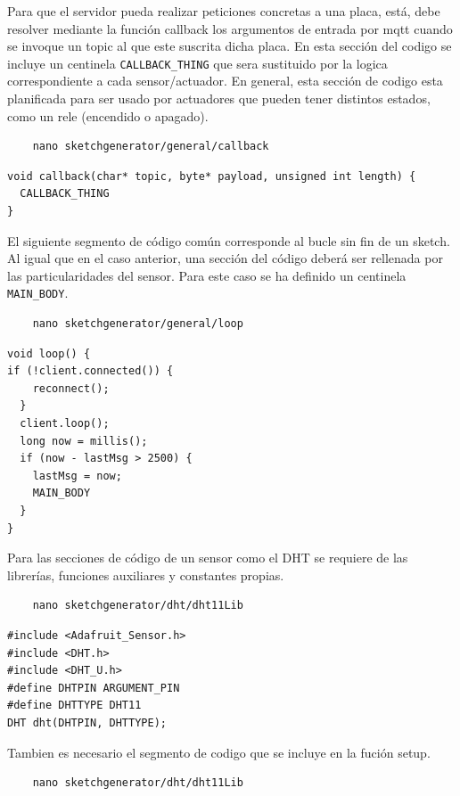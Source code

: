 Para que el servidor pueda realizar peticiones concretas a una placa, está, debe resolver mediante la función callback los argumentos de entrada por \gls{mqtt} cuando se invoque un topic al que este suscrita dicha placa. En esta sección del codigo se incluye un centinela \verb|CALLBACK_THING| que sera sustituido por la logica correspondiente a cada sensor/actuador. En general, esta sección de codigo esta planificada para ser usado por actuadores que pueden tener distintos estados, como un rele (encendido o apagado).

\begin{verbatim}
    nano sketchgenerator/general/callback
\end{verbatim}

\begin{verbatim}
void callback(char* topic, byte* payload, unsigned int length) {
  CALLBACK_THING
}
\end{verbatim}


El siguiente segmento de código común corresponde al bucle sin fin de un \gls{sketch}. Al igual que en el caso anterior, una sección del código deberá ser rellenada por las particularidades del sensor. Para este caso se ha definido un centinela \verb|MAIN_BODY|.

\begin{verbatim}
    nano sketchgenerator/general/loop
\end{verbatim}

\begin{verbatim}
void loop() {
if (!client.connected()) {
    reconnect();
  }
  client.loop();
  long now = millis();
  if (now - lastMsg > 2500) {
    lastMsg = now;
    MAIN_BODY
  }
}
\end{verbatim}

Para las secciones de código de un sensor como el DHT se requiere de las librerías, funciones auxiliares y constantes propias.
\begin{verbatim}
    nano sketchgenerator/dht/dht11Lib
\end{verbatim}

\begin{verbatim}
#include <Adafruit_Sensor.h>
#include <DHT.h>
#include <DHT_U.h>
#define DHTPIN ARGUMENT_PIN
#define DHTTYPE DHT11
DHT dht(DHTPIN, DHTTYPE);
\end{verbatim}

Tambien es necesario el segmento de codigo que se incluye en la fución setup.
\begin{verbatim}
    nano sketchgenerator/dht/dht11Lib
\end{verbatim}

